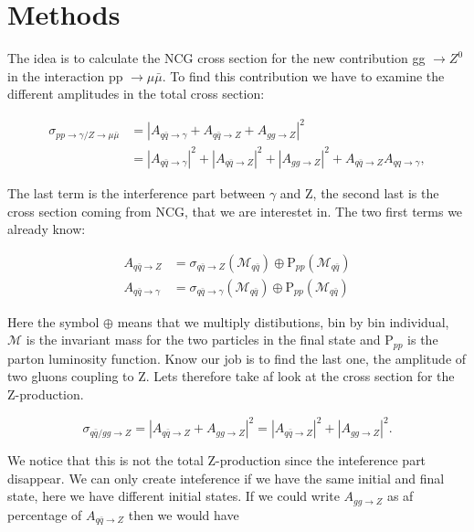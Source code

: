 \section{Methods}
The idea is to calculate the NCG cross section for the new contribution gg $\rightarrow Z^0$ in the interaction pp $\rightarrow \mu \bar \mu$. To find this contribution we have to examine the different amplitudes in the total cross section:

\begin{align}
\sigma_{pp \rightarrow \gamma/ Z \rightarrow \mu \bar \mu} &= |A_{q \bar q \rightarrow \gamma} + A_{q \bar q \rightarrow Z} + A_{gg \rightarrow Z}|^{2} \nonumber \\
&= |A_{q \bar q \rightarrow \gamma}|^{2} + |A_{q \bar q \rightarrow Z}|^ {2} + |A_{gg \rightarrow Z}|^{2} + A_{q \bar q \rightarrow Z }A_{qq \rightarrow \gamma},
\end{align}

The last term is the interference part between $\gamma$ and Z, the second last is the cross section coming from NCG, that we are interestet in. The two first terms we already know:

\begin{align}
A_{q \bar q \rightarrow Z} &= \sigma_{q \bar q \rightarrow Z} (\mathcal{M}_{q \bar q}) \oplus \textrm{P}_{pp}(\mathcal{M}_{q \bar q}) \nonumber \\ 
A_{q \bar q \rightarrow \gamma} &= \sigma_{q \bar q \rightarrow  \gamma}( \mathcal{M}_{q \bar q}) \oplus \textrm{P}_{pp}(\mathcal{M}_{q \bar q})
\end{align}

Here the symbol $\oplus$ means that we multiply distibutions, bin by bin individual, $\mathcal{M}$ is the invariant mass for the two particles in the final state and P$_{pp}$ is the parton luminosity function. Know our job is to find the last one, the amplitude of two gluons coupling to Z. Lets therefore take af look at the cross section for the Z-production.

\begin{equation}
\sigma_{q \bar q/gg \rightarrow Z} = |A_{q \bar q \rightarrow Z} + A_{gg \rightarrow Z}|^{2}=|A_{q \bar q \rightarrow Z}|^{2}+|A_{gg \rightarrow Z}|^{2}.
\end{equation}

We notice that this is not the total Z-production since the inteference part disappear. We can only create inteference if we have the same initial and final state, here we have different initial states. If we could write $A_{gg \rightarrow Z}$ as af percentage of $A_{q \bar q \rightarrow Z}$ then we would have

